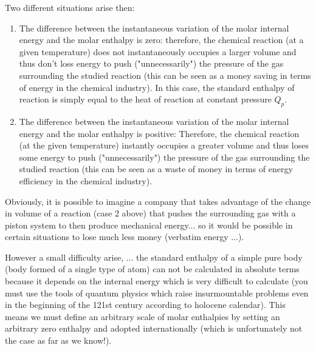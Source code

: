 	Two different situations arise then:
	\begin{enumerate}
		\item The difference between the instantaneous variation of the molar internal energy and the molar enthalpy is zero: therefore, the chemical reaction (at a given temperature) does not instantaneously occupies a larger volume and thus don't loss energy to push ("unnecessarily") the pressure of the gas surrounding the studied reaction (this can be seen as a money saving in terms of energy in the chemical industry). In this case, the standard enthalpy of reaction is simply equal to the heat of reaction at constant pressure $Q_p$.

		\item The difference between the instantaneous variation of the molar internal energy and the molar enthalpy is positive: Therefore, the chemical reaction (at the given temperature) instantly occupies a greater volume and thus loses some energy to push ("unnecessarily") the pressure of the gas surrounding the studied reaction  (this can be seen as a waste of money in terms of energy efficiency in the chemical industry).
	\end{enumerate}
	\begin{tcolorbox}[title=Remark,arc=10pt,breakable,drop lifted shadow,
  skin=enhanced,
  skin first is subskin of={enhancedfirst}{arc=10pt,no shadow},
  skin middle is subskin of={enhancedmiddle}{arc=10pt,no shadow},
  skin last is subskin of={enhancedlast}{drop lifted shadow}]
	Obviously, it is possible to imagine a company that takes advantage of the change in volume of a reaction (case 2 above) that pushes the surrounding gas with a piston system to then produce mechanical energy... so it would be possible in certain situations to lose much less money (verbatim energy ...).
	\end{tcolorbox}
	However a small difficulty arise, ... the standard enthalpy of a simple pure body (body formed of a single type of atom) can not be calculated in absolute terms because it depends on the internal energy which is very difficult to calculate (you must use the tools of quantum physics which raise insurmountable problems even in the beginning of the 121st century according to holocene calendar). This means we must define an arbitrary scale of molar enthalpies by setting an arbitrary zero enthalpy and adopted internationally (which is unfortunately not the case as far as we know!).

